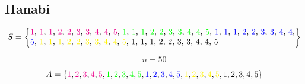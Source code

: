 \documentclass{article}
\begin{document}
\subsection{Hanabi}

\begin{equation}\nonumber
    S = \left \{\\
    \parbox{32em}{
     \color{magenta}1\color{black}, \color{magenta}1\color{black}, \color{magenta}1\color{black}, \color{magenta}2\color{black}, \color{magenta}2\color{black}, \color{magenta}3\color{black}, \color{magenta}3\color{black}, \color{magenta}4\color{black}, \color{magenta}4\color{black}, \color{magenta}5\color{black}, \color{green}1\color{black}, \color{green}1\color{black}, \color{green}1\color{black}, \color{green}2\color{black}, \color{green}2\color{black}, \color{green}3\color{black}, \color{green}3\color{black}, \color{green}4\color{black}, \color{green}4\color{black}, \color{green}5\color{black}, \color{blue}1\color{black}, \color{blue}1\color{black}, \color{blue}1\color{black}, \color{blue}2\color{black}, \color{blue}2\color{black}, \color{blue}3\color{black}, \color{blue}3\color{black}, \color{blue}4\color{black}, \color{blue}4\color{black}, \color{blue}5\color{black}, \color{yellow}1\color{black}, \color{yellow}1\color{black}, \color{yellow}1\color{black}, \color{yellow}2\color{black}, \color{yellow}2\color{black}, \color{yellow}3\color{black}, \color{yellow}3\color{black}, \color{yellow}4\color{black}, \color{yellow}4\color{black}, \color{yellow}5\color{black}, 1, 1, 1, 2, 2, 3, 3, 4, 4, 5
     }\right \}
\end{equation}

\begin{equation}\nonumber
    n = 50
\end{equation}

\begin{equation}\nonumber
    A = \left \{
     \color{magenta}1\color{black}, \color{magenta}2\color{black}, \color{magenta}3\color{black},  \color{magenta}4\color{black}, \color{magenta}5\color{black}, \color{green}1\color{black}, \color{green}2\color{black}, \color{green}3\color{black},  \color{green}4\color{black}, \color{green}5\color{black}, \color{blue}1\color{black}, \color{blue}2\color{black}, \color{blue}3\color{black}, \color{blue}4\color{black}, \color{blue}5\color{black}, \color{yellow}1\color{black}, \color{yellow}2\color{black},  \color{yellow}3\color{black}, \color{yellow}4\color{black}, \color{yellow}5\color{black}, 1, 2, 3, 4, 5\right \}
\end{equation}
\end{document}
